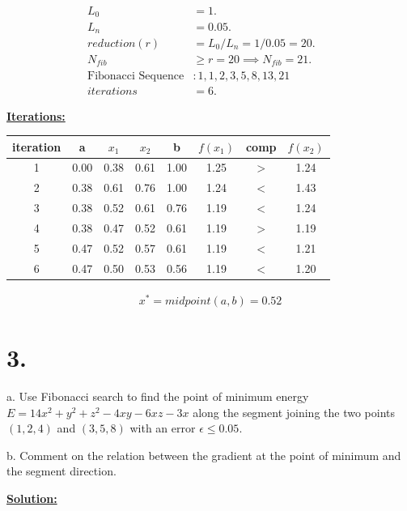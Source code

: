 \documentclass{article}
\begin{document}
\begin{align*}
 L_0 &= 1. &&\\
 L_n &= 0.05. &&\\
 reduction (r) &= L_0 / L_n = 1/0.05 = 20. &&\\
 N_{fib} &\geq r = 20 \implies N_{fib} = 21. &&\\
 \text{Fibonacci Sequence}&: 1, 1, 2, 3, 5, 8, 13, 21 &&\\
 iterations &= 6.
\end{align*}

\textbf{\underline{Iterations:}}
\newline

\begin{tabular}{ |c|c|c|c|c|c|c|c| }
\hline
iteration & a & $x_1$ & $x_2$ & b & $f(x_1)$ & comp & $f(x_2)$ \\ 
\hline 
1	& 0.00	& 0.38	& 0.61 &	1.00	& 1.25 &	$>$	& 1.24 \\
\hline
2	& 0.38	& 0.61	& 0.76 &	1.00	& 1.24 &	$<$	& 1.43 \\
\hline
3	& 0.38	& 0.52	& 0.61 &	0.76	& 1.19 &	$<$	& 1.24 \\
\hline
4	& 0.38	& 0.47	& 0.52 &	0.61	& 1.19 &	$>$	& 1.19 \\
\hline
5	& 0.47	& 0.52	& 0.57 &	0.61	& 1.19 &	$<$	& 1.21 \\
\hline
6	& 0.47 & 0.50 &	0.53 &	0.56 & 1.19 & $<$ &	1.20 \\
\hline
\end{tabular}
\newline

\begin{align*}
  x^* = midpoint(a,b) = 0.52
\end{align*}

\newpage

\section*{3.}
a. Use Fibonacci search to find the point of minimum energy $E = 14x^2 + y^2 + z^2 - 4xy - 6xz - 3x$ along the segment joining the two points $(1, 2, 4)$ and $(3, 5, 8)$ with an error $\epsilon \leq 0.05$.
\newline

\noindent
b. Comment on the relation between the gradient at the point of minimum and the segment direction.

\begin{center}
  \textbf{\underline{Solution:}}  
\end{center}
\end{document}
